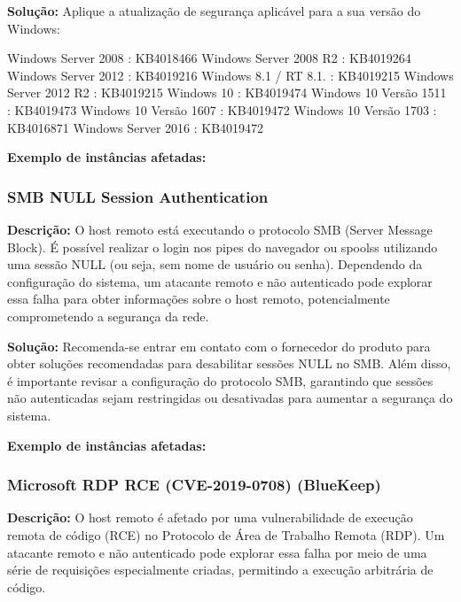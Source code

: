 \documentclass[a4paper,12pt]{article}
\begin{document}
\textbf{Solução:}
Aplique a atualização de segurança aplicável para a sua versão do Windows:

Windows Server 2008 : KB4018466
Windows Server 2008 R2 : KB4019264
Windows Server 2012 : KB4019216
Windows 8.1 / RT 8.1. : KB4019215
Windows Server 2012 R2 : KB4019215
Windows 10 : KB4019474
Windows 10 Versão 1511 : KB4019473
Windows 10 Versão 1607 : KB4019472
Windows 10 Versão 1703 : KB4016871
Windows Server 2016 : KB4019472

\textbf{Exemplo de instâncias afetadas:}
\begin{itemize}
\end{itemize}

\subsubsection{SMB NULL Session Authentication}

\textbf{Descrição:}
O host remoto está executando o protocolo SMB (Server Message Block). É possível realizar o login nos pipes do navegador ou spoolss utilizando uma sessão NULL (ou seja, sem nome de usuário ou senha). Dependendo da configuração do sistema, um atacante remoto e não autenticado pode explorar essa falha para obter informações sobre o host remoto, potencialmente comprometendo a segurança da rede.

\textbf{Solução:}
Recomenda-se entrar em contato com o fornecedor do produto para obter soluções recomendadas para desabilitar sessões NULL no SMB. Além disso, é importante revisar a configuração do protocolo SMB, garantindo que sessões não autenticadas sejam restringidas ou desativadas para aumentar a segurança do sistema.

\textbf{Exemplo de instâncias afetadas:}
\begin{itemize}
\end{itemize}


\subsubsection{Microsoft RDP RCE (CVE-2019-0708) (BlueKeep)}

\textbf{Descrição:}  
O host remoto é afetado por uma vulnerabilidade de execução remota de código (RCE) no Protocolo de Área de Trabalho Remota (RDP). Um atacante remoto e não autenticado pode explorar essa falha por meio de uma série de requisições especialmente criadas, permitindo a execução arbitrária de código.
  
\end{document}
